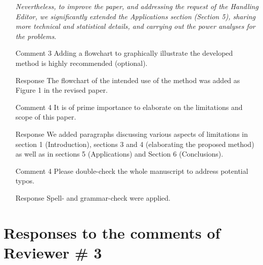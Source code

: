 \documentclass{article}
\begin{document}
\begin{itemize}
\emph{Nevertheless, to improve the paper, and addressing the request of the Handling Editor, we significantly extended the Applications section (Section 5), sharing more technical and statistical details, and carrying out the power analyses for the problems}.
\item [Comment 3] Adding a flowchart to graphically illustrate the developed method is highly recommended (optional).
\item [Response] The flowchart of the intended use of the method was added as Figure 1 in the revised paper.
\item [Comment 4] It is of prime importance to elaborate on the limitations and scope of this paper.
\item [Response] We added paragraphs discussing various aspects of limitations in section 1 (Introduction), sections 3 and 4 (elaborating the proposed method) as well as in sections 5 (Applications) and Section 6 (Conclusions). 
\item [Comment 4] Please double-check the whole manuscript to address potential typos.
\item [Response] Spell- and grammar-check were applied.
\end{itemize}

\section{Responses to the comments of Reviewer \# 3}
\end{document}
